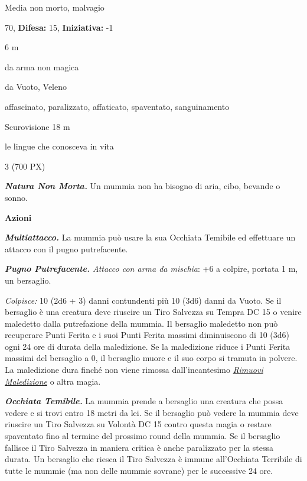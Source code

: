 \begin{multicols}{2}
{
\noindent
\begin{description}[noitemsep, topsep=0pt, parsep=0pt, partopsep=0pt, leftmargin=0cm, labelwidth=2.2cm]
	\item[\textbf{Taglia/Tipo:}] Media non morto, malvagio
	\item[\textbf{Caratt.:}] 
	\item[\textbf{Punti Ferita:}] 70,  \textbf{Difesa:} 15,  \textbf{Iniziativa:} -1
	\item[\textbf{Movimento:}] 6 m
	\item[\textbf{Tiri Salvez.:}] 
	\item[\textbf{Res. Danni:}] da arma non magica
	\item[\textbf{Imm. Danni:}] da Vuoto, Veleno
	\item[\textbf{Immunità:}] affascinato, paralizzato, affaticato, spaventato, sanguinamento
	\item[\textbf{Sensi:}] Scurovisione 18 m
	\item[\textbf{Linguaggi:}] le lingue che conosceva in vita
	\item[\textbf{Sfida:}] 3 (700 PX)\smallskip
\end{description}

\emph{\textbf{Natura Non Morta.}} Un mummia non ha bisogno di aria, cibo, bevande o sonno.

\textbf{Azioni}

\emph{\textbf{Multiattacco.}} La mummia può usare la sua Occhiata Temibile ed effettuare un attacco con il pugno putrefacente.

\emph{\textbf{Pugno Putrefacente.} Attacco con arma da mischia}: +6 a colpire, portata 1 m, un bersaglio.

\emph{Colpisce:} 10 (2d6 + 3) danni contundenti più 10 (3d6) danni da Vuoto. Se il bersaglio è una creatura deve riuscire un Tiro Salvezza su Tempra DC 15 o venire maledetto dalla putrefazione della mummia. Il bersaglio maledetto non può recuperare Punti Ferita e i suoi Punti Ferita massimi diminuiscono di 10 (3d6) ogni 24 ore di durata della maledizione. Se la maledizione riduce i Punti Ferita massimi del bersaglio a 0, il bersaglio muore e il suo corpo si tramuta in polvere. La maledizione dura finché non viene rimossa dall'incantesimo \emph{\hyperlink{Rimuovi Maledizione}{Rimuovi Maledizione}} o altra magia.

\emph{\textbf{Occhiata Temibile.}} La mummia prende a bersaglio una creatura che possa vedere e si trovi entro 18 metri da lei. Se il bersaglio può vedere la mummia deve riuscire un Tiro Salvezza su Volontà DC 15 contro questa magia o restare spaventato fino al termine del prossimo round della mummia. Se il bersaglio fallisce il Tiro Salvezza in maniera critica è anche paralizzato per la stessa durata. Un bersaglio che riesca il Tiro Salvezza è immune all'Occhiata Terribile di tutte le mummie (ma non delle mummie sovrane) per le successive 24 ore.

}
\end{multicols}
